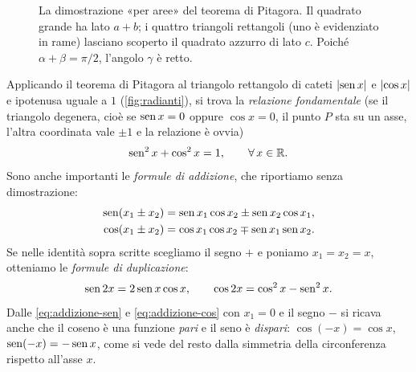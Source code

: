 \begin{figure}[htb]
\centering
{}
\caption{La dimostrazione «per aree» del teorema di Pitagora. Il quadrato grande ha lato
$a+b$; i quattro triangoli rettangoli (uno è evidenziato in rame) lasciano scoperto il
quadrato azzurro di lato $c$. Poiché $\alpha+\beta=\pi/2$, l'angolo $\gamma$ è retto.}
\label{fig:pitagora}
\end{figure}

Applicando il teorema di Pitagora al triangolo rettangolo di cateti $\lvert \operatorname{sen} x\rvert$ e
$\lvert \cos x\rvert$ e ipotenusa uguale a $1$ (\cref{fig:radianti}), si trova la
\emph{relazione fondamentale} (se il triangolo degenera, cioè se $\operatorname{sen} x=0$ oppure
$\cos x=0$, il punto $P$ sta su un asse, l'altra coordinata vale $\pm1$ e la relazione
è ovvia)
\begin{equation}\label{eq:relazione-fondamentale}
  \operatorname{sen}^{2}x+\cos^{2}x=1, \qquad\forall\, x\in\mathbb{R}.
\end{equation}
Sono anche importanti le \emph{formule di addizione}, che
riportiamo senza dimostrazione:
\begin{align}
  \operatorname{sen}(x_{1}\pm x_{2}) &= \operatorname{sen} x_{1}\cos x_{2}\pm\operatorname{sen} x_{2}\cos x_{1}, \label{eq:addizione-sen}\\
  \cos(x_{1}\pm x_{2}) &= \cos x_{1}\cos x_{2}\mp\operatorname{sen} x_{1}\operatorname{sen} x_{2}. \label{eq:addizione-cos}
\end{align}
Se nelle identità sopra scritte scegliamo il segno $+$ e poniamo $x_{1}=x_{2}=x$,
otteniamo le \emph{formule di duplicazione}:
\begin{equation}\label{eq:duplicazione}
  \operatorname{sen}2x=2\operatorname{sen} x\cos x, \qquad \cos2x=\cos^{2}x-\operatorname{sen}^{2}x .
\end{equation}
Dalle \eqref{eq:addizione-sen} e \eqref{eq:addizione-cos} con $x_{1}=0$ e il segno $-$
si ricava anche che il coseno è una funzione \emph{pari} e il seno è \emph{dispari}: $\cos(-x)=\cos x$,
$\operatorname{sen}(-x)=-\operatorname{sen} x$, come si vede del resto dalla simmetria della circonferenza rispetto
all'asse $x$.

